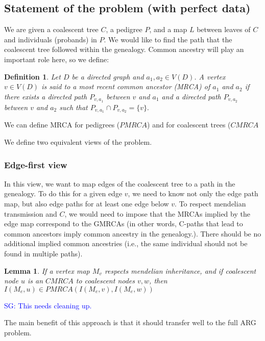 \documentclass[14pt]{extarticle}
\newtheorem{definition}{Definition}
\newtheorem{lemma}{Lemma}
\newcommand{\sgcomment}[1]{\textcolor{blue}{SG: #1}}
\begin{document}
\subsection{Statement of the problem (with perfect data)} 


We are given a coalescent tree $C$, a pedigree $P$, and a map $L$ between leaves of $C$ and individuals (probands) in  $P.$ 
We would like to find the path that the coalescent tree followed within the genealogy. Common ancestry will play an important role here, so we define: 


\begin{definition}
	Let $D$ be a directed graph and $a_1, a_2 \in V(D)$. A vertex $v \in V(D)$ is said to a most recent common ancestor (MRCA) of $a_1$ and $a_2$ if there exists 
	a directed path $P_{v,a_1}$ between $v$ and $a_1$ and a directed path $P_{v,a_2}$ between $v$ and $a_2$ such that $P_{v,a_1} \cap P_{v,a_2} = \{v\}.$	
\end{definition}

We can define MRCA for pedigrees ($PMRCA$) and for coalescent trees ($CMRCA$

We define two equivalent views of the problem. 

\subsubsection{Edge-first view}
In this view, we want to map edges of the coalescent tree to a path in the genealogy. To do this for a given edge $v$, we need to know not only the edge path map, 
but also edge paths for at least one edge below $v$. To respect mendelian transmission and $C$, we would need to impose that the MRCAs implied by the edge map 
correspond to the GMRCAs (in other words, C-paths that lead to common ancestors imply common ancestry in the genealogy.).
There should be no additional implied common ancestries (i.e., the same individual should not be found in multiple paths).  


\begin{lemma}
If a vertex map $M_v$ respects mendelian inheritance, and if coalescent node $u$ is an $CMRCA$ to coalescent nodes $v, w$, then $I (M_e, u) \in PMRCA(I(M_e,v),I(M_e,w))$   
\end{lemma}
\sgcomment{This needs cleaning up.}

The main benefit of this approach is that it should transfer well to the full ARG problem. 
\end{document}
